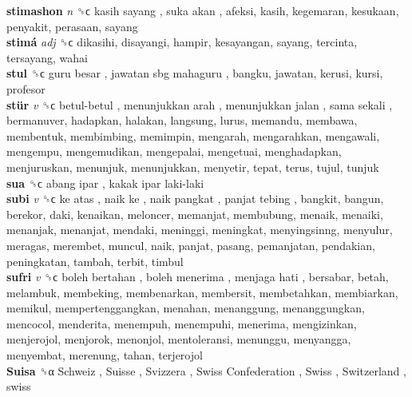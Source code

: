 \textbf{stimashon} \emph{n}  ␝ϲ   kasih sayang ,  suka akan , afeksi, kasih, kegemaran, kesukaan, penyakit, perasaan, sayang  \\
\textbf{stimá} \emph{adj}  ␝ϲ  dikasihi, disayangi, hampir, kesayangan, sayang, tercinta, tersayang, wahai  \\
\textbf{stul} ␝ϲ   guru besar ,  jawatan sbg mahaguru , bangku, jawatan, kerusi, kursi, profesor  \\
\textbf{stür} \emph{v}  ␝ϲ   betul-betul ,  menunjukkan arah ,  menunjukkan jalan ,  sama sekali , bermanuver, hadapkan, halakan, langsung, lurus, memandu, membawa, membentuk, membimbing, memimpin, mengarah, mengarahkan, mengawali, mengempu, mengemudikan, mengepalai, mengetuai, menghadapkan, menjuruskan, menunjuk, menunjukkan, menyetir, tepat, terus, tujul, tunjuk  \\
\textbf{sua} ␝ϲ   abang ipar ,  kakak ipar laki-laki   \\
\textbf{subi} \emph{v}  ␝ϲ   ke atas ,  naik ke ,  naik pangkat ,  panjat tebing , bangkit, bangun, berekor, daki, kenaikan, meloncer, memanjat, membubung, menaik, menaiki, menanjak, menanjat, mendaki, meninggi, meningkat, menyingsinng, menyulur, meragas, merembet, muncul, naik, panjat, pasang, pemanjatan, pendakian, peningkatan, tambah, terbit, timbul  \\
\textbf{sufri} \emph{v}  ␝ϲ   boleh bertahan ,  boleh menerima ,  menjaga hati , bersabar, betah, melambuk, membeking, membenarkan, membersit, membetahkan, membiarkan, memikul, mempertenggangkan, menahan, menanggung, menanggungkan, mencocol, menderita, menempuh, menempuhi, menerima, mengizinkan, menjerojol, menjorok, menonjol, mentoleransi, menunggu, menyangga, menyembat, merenung, tahan, terjerojol  \\
\textbf{Suisa} ␝α   Schweiz ,  Suisse ,  Svizzera ,  Swiss Confederation ,  Swiss ,  Switzerland , swiss  \\
